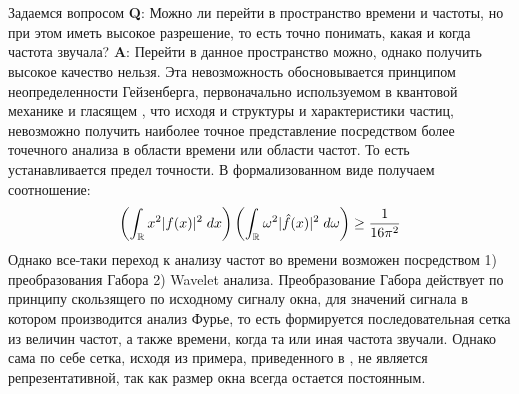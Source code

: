  \label{link::wavelet_analysis}
\\\\
\indent Задаемся вопросом \textbf{Q}: Можно ли перейти в пространство времени и частоты, но при этом иметь высокое разрешение, то есть точно понимать, какая и когда частота звучала? \textbf{A}: Перейти в данное пространство можно, однако получить высокое качество нельзя. Эта невозможность обосновывается принципом неопределенности Гейзенберга, первоначально используемом в квантовой механике и гласящем \cite{busch2007heisenberg, brunton2022data}, что исходя и структуры и характеристики частиц, невозможно получить наиболее точное представление посредством более точечного анализа в области времени или области частот. То есть устанавливается предел точности. В формализованном виде получаем соотношение:
\begin{equation}
	\left(\int_{\mathbb{R}}x^2 |f(x)|^2 \; dx \right) \left(\int_{\mathbb{R}}\omega^2 |\hat{f}(x)|^2 \; d \omega \right) \ge \frac{1}{16 \pi^2}
\end{equation}
Однако все-таки переход к анализу частот во времени возможен посредством 1) преобразования Габора \cite{brunton2022data} 2) Wavelet анализа. Преобразование Габора действует по принципу скользящего по исходному сигналу окна, для значений сигнала в котором производится анализ Фурье, то есть формируется последовательная сетка из величин частот, а также времени, когда та или иная частота звучали. Однако сама по себе сетка, исходя из примера, приведенного в \cite{brunton2022data}, не является репрезентативной, так как размер окна всегда остается постоянным. 

